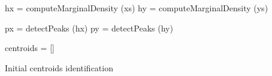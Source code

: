 \begin{algorithm}[h]

 hx = computeMarginalDensity (xs)\;
 hy = computeMarginalDensity (ys)\;

 px = detectPeaks (hx)\;
 py = detectPeaks (hy)\;

 centroids = []\;
 \caption{Initial centroids identification}\label{alg:grid_creation}
\end{algorithm}
